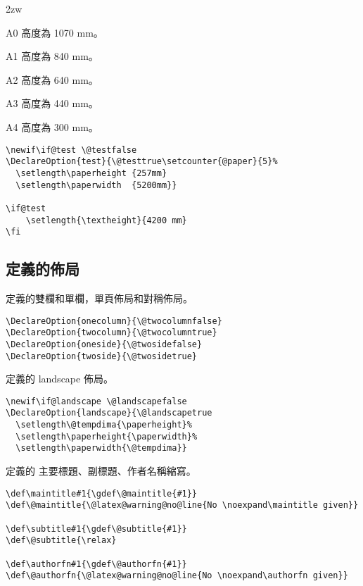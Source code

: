\par{}
\begin{biao}[高度]\leftskip 2zw
\item[A0] 高度為 1070 mm。
\item[A1] 高度為 840 mm。
\item[A2] 高度為 640 mm。
\item[A3]	高度為 440 mm。
\item[A4] 高度為 300 mm。
\end{biao}

\begin{lstlisting}[firstnumber=36]
\newif\if@test \@testfalse
\DeclareOption{test}{\@testtrue\setcounter{@paper}{5}%
  \setlength\paperheight {257mm}
  \setlength\paperwidth  {5200mm}}

\if@test
    \setlength{\textheight}{4200 mm}
\fi
\end{lstlisting}

\subsection{定義的佈局}

\par 定義的雙欄和單欄，單頁佈局和對稱佈局。
\begin{lstlisting}[firstnumber=45]
\DeclareOption{onecolumn}{\@twocolumnfalse}
\DeclareOption{twocolumn}{\@twocolumntrue}
\DeclareOption{oneside}{\@twosidefalse}
\DeclareOption{twoside}{\@twosidetrue}
\end{lstlisting}

\par 定義的 landscape 佈局。
\begin{lstlisting}[firstnumber=51]
\newif\if@landscape \@landscapefalse
\DeclareOption{landscape}{\@landscapetrue
  \setlength\@tempdima{\paperheight}%
  \setlength\paperheight{\paperwidth}%
  \setlength\paperwidth{\@tempdima}}
\end{lstlisting}


\par 定義的 主要標題、副標題、作者名稱縮寫。
\begin{lstlisting}[firstnumber=58]
\def\maintitle#1{\gdef\@maintitle{#1}}
\def\@maintitle{\@latex@warning@no@line{No \noexpand\maintitle given}}

\def\subtitle#1{\gdef\@subtitle{#1}}
\def\@subtitle{\relax}

\def\authorfn#1{\gdef\@authorfn{#1}}
\def\@authorfn{\@latex@warning@no@line{No \noexpand\authorfn given}}
\end{lstlisting}

